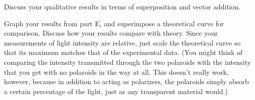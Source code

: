 \analysis

Discuss your qualitative results in terms of superposition
and vector addition.

Graph your results from part E, and superimpose a
theoretical curve for comparison. Discuss how your results
compare with theory. Since your measurements of light
intensity are relative, just scale the theoretical curve so
that its maximum matches that of the experimental data. (You
might think of comparing the intensity transmitted through
the two polaroids with the intensity that you get with no
polaroids in the way at all. This doesn't really work,
however, because in addition to acting as polarizers, the
polaroids simply absorb a certain percentage of the light,
just as any transparent material would.)
